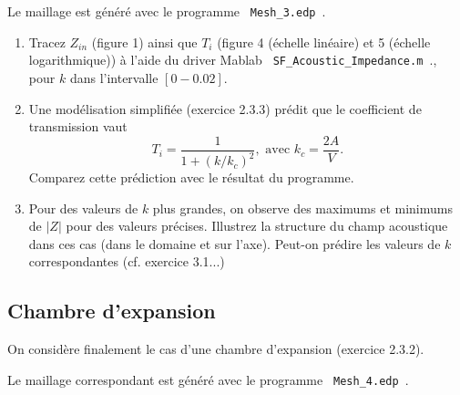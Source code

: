 \documentclass[11pt,a4paper]{article}
\begin{document}
Le maillage est généré avec le programme \verb| Mesh_3.edp |.


\begin{enumerate}
\item 
Tracez $Z_{in}$ (figure 1) ainsi que $T_i$ (figure 4 (échelle linéaire) et 5 (échelle logarithmique))  à l'aide du driver Mablab 
\verb| SF_Acoustic_Impedance.m |., pour $k$ dans l'intervalle $[0-0.02]$.

\item Une modélisation simplifiée (exercice 2.3.3) prédit que le coefficient de transmission vaut 
$$
T_i  = \frac{1}{1+(k/k_c)^2}, \mbox{ avec } k_c = \frac{2 A}{V}.
$$
Comparez cette prédiction avec le résultat du programme.

\item Pour des valeurs de $k$ plus grandes, on observe des maximums et minimums de $|Z|$ pour des valeurs précises. Illustrez la structure du champ acoustique dans ces cas (dans le domaine et sur l'axe). Peut-on prédire les valeurs de $k$ correspondantes (cf. exercice 3.1...)






\end{enumerate}



\subsection{Chambre d'expansion}

On considère finalement le cas d'une chambre d'expansion (exercice 2.3.2).

Le maillage correspondant est généré avec le programme \verb| Mesh_4.edp |.
\end{document}
